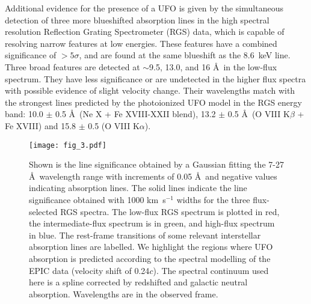 \documentclass[10pt, a4paper]{article}
\begin{document}
Additional evidence for the presence of a UFO is given by the simultaneous detection of three more blueshifted absorption lines in the high spectral resolution Reflection Grating Spectrometer (RGS\cite{denHerder01}) data, which is capable of resolving narrow features at low energies. These features have a combined significance of $>5\sigma$, and are found at the same blueshift as the 8.6~keV line. Three broad features are detected at $\sim$9.5, 13.0, and 16 \AA\ in the low-flux spectrum. They have less significance or are undetected in the higher flux spectra with possible evidence of slight velocity change. Their wavelengths match with the strongest lines predicted by the photoionized UFO model in the RGS energy band: 10.0 $\pm$ 0.5 \AA\ (Ne X + Fe XVIII-XXII blend), 13.2 $\pm$ 0.5 \AA\ (O VIII K$\beta$ + Fe XVIII) and 15.8 $\pm$ 0.5 (O VIII K$\alpha$).

\begin{figure}[t]
\centering
\texttt{[image: fig\_3.pdf]}
\caption{Shown is the line significance obtained by a Gaussian fitting the 7-27 \AA\ wavelength range with increments of 0.05 \AA\ and negative values indicating absorption lines. The solid lines indicate the line significance obtained with 1000 km~s$^{-1}$ widths for the three flux-selected RGS spectra. The low-flux RGS spectrum is plotted in red, the intermediate-flux spectrum is in green, and high-flux spectrum in blue. The rest-frame transitions of some relevant interstellar absorption lines are labelled. We highlight the regions where UFO absorption is predicted according to the spectral modelling of the EPIC data (velocity shift of 0.24$c$). The spectral continuum used here is a spline corrected by redshifted and galactic neutral absorption. Wavelengths are in the observed frame.
}
\label{fig_rgs_significance}
\end{figure}
\end{document}
